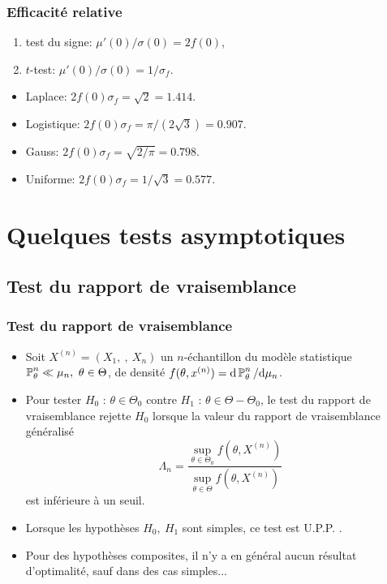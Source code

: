 \begin{frame}
\frametitle{Efficacité relative}
\begin{enumerate}
\item test du signe: $\mu'(0)/\sigma(0)=2 f(0)$,
\item $t$-test: $\mu'(0)/\sigma(0)=1/\sigma_f$.
\end{enumerate}

\begin{itemize}
\item Laplace: $2 f(0) \sigma_f  = \sqrt{2}=1.414$.
\item Logistique: $2 f(0) \sigma_f  = \pi/(2\sqrt{3})=0.907$.
\item Gauss: $2 f(0) \sigma_f = \sqrt{2/\pi}=0.798$.
\item Uniforme: $2 f(0) \sigma_f = 1/\sqrt{3}=0.577$.
\end{itemize}
\end{frame}

\section{Quelques tests asymptotiques}

\subsection{Test du rapport de vraisemblance}
\begin{frame}
\frametitle{Test du rapport de vraisemblance}
 \begin{itemize}
 \item Soit  $X^{(n)}= (X_{1},\ ,\ X_{n})$ un $n$-échantillon du modèle statistique $\PP_{\theta}^{n}\ll\mu_{n},\ \theta\in\Theta$, de densité  $f(\theta,x^{(n)})= \mathrm{d} \operatorname{{\mathbb P}}_{\theta}^{n}/ \mathrm{d} \mu_{n}$.
 \item Pour tester $H_{0}$ : $\theta\in\Theta_{0}$  contre $H_{1}$ : $\theta\in\Theta-\Theta_{0}$, le test du \alert{rapport de vraisemblance} rejette $H_{0}$ lorsque la valeur du \alert{rapport de vraisemblance généralisé}
$$
\Lambda_{n}=\frac{\sup_{\theta\in\Theta_{0}}f(\theta,X^{(n)})}{\sup_{\theta\in\Theta}f(\theta,X^{(n)})}
$$
est inférieure à un seuil.
\item   Lorsque les hypothèses $H_{0},\ H_{1}$ sont simples, ce test est U.P.P. .
\item Pour des hypothèses composites, il n'y a en général aucun résultat d'optimalité, sauf dans des cas simples...
\end{itemize}
\end{frame}

